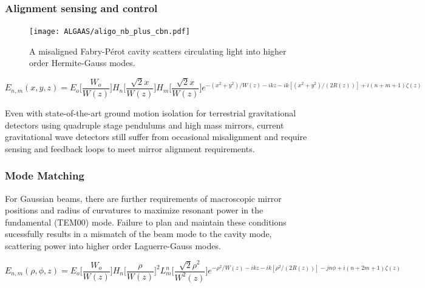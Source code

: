 \subsubsection{Alignment sensing and control}

\begin{figure}[H]
    \begin{center}
    \texttt{[image: ALGAAS/aligo\_nb\_plus\_cbn.pdf]}
    \end{center}
    \caption{A misaligned Fabry-P\'{e}rot cavity scatters circulating light into higher order Hermite-Gauss modes.}
\label{fig:aligo_tn_comparison}
\end{figure}

\begin{equation}
	E_{n,m}(x,y,z) = E_o \bigg[ \frac{W_o}{W(z)} \bigg] H_n \bigg[ \frac{\sqrt{2}x}{W(z)} \bigg] H_m \bigg[ \frac{\sqrt{2}x}{W(z)} \bigg] e^{-(x^2 + y^2)/W(z) - ikz - ik[(x^2 + y^2)/(2R(z))] + i(n + m + 1)\zeta(z)}
\end{equation}

Even with state-of-the-art ground motion isolation for terrestrial gravitational detectors using quadruple stage pendulums and high mass mirrors, current gravitational wave detectors still suffer from occasional misalignment and require sensing and feedback loops to meet mirror alignment requirements.

\subsubsection{Mode Matching}
For Gaussian beams, there are further requirements of macroscopic mirror positions and radius of curvatures to maximize resonant power in the fundamental (TEM00) mode. Failure to plan and maintain these conditions sucessfully results in a mismatch of the beam mode to the cavity mode, scattering power into higher order Laguerre-Gauss modes.  

\begin{equation}
	E_{n,m}(\rho, \phi, z) =  E_o \bigg[ \frac{W_o}{W(z)} \bigg] H_n \bigg[ \frac{\rho}{W(z)} \bigg]^2 L^n_m \bigg[ \frac{\sqrt{2}\rho^2}{W^2(z)} \bigg] e^{-\rho^2/W(z) - ikz - ik[\rho^2/(2R(z))] - jn \phi + i(n + 2m + 1)\zeta(z)}
\end{equation}

